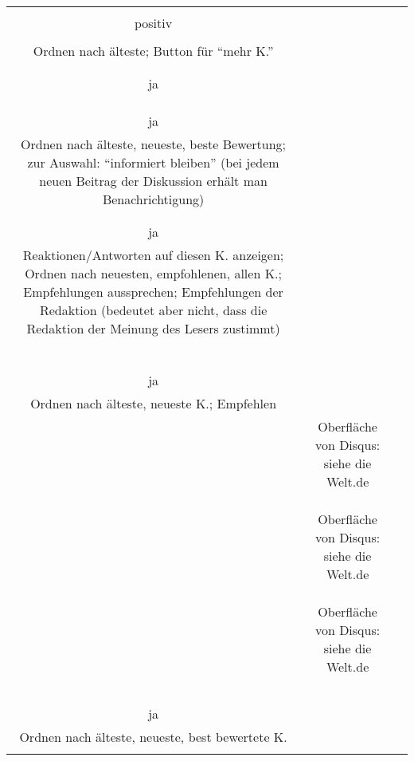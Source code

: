 \begin{landscape}
\begin{tabular}{ccc}
{		\\
		positiv\\
		\\
		Ordnen nach älteste; Button für ``mehr K.''\\
		\\
		\\
		ja\\
		\\
		&
		\\
		\\
		ja\\
		Ordnen nach älteste, neueste, beste Bewertung; zur Auswahl: ``informiert bleiben'' (bei jedem neuen Beitrag der Diskussion erhält man Benachrichtigung)\\
		&
		\\
		\\
		ja\\
		Reaktionen/Antworten auf diesen K. anzeigen; Ordnen nach neuesten, empfohlenen, allen K.; Empfehlungen aussprechen; Empfehlungen der Redaktion (bedeutet aber nicht, dass die Redaktion der Meinung des Lesers zustimmt)\\
		&
		\\
		\\
		\\
		\\
		&%
		\\
		\\
		ja\\
		Ordnen nach älteste, neueste K.; Empfehlen\\
		&%
		Oberfläche von Disqus: siehe die Welt.de\\
		\\
		\\
		\\
		&
		Oberfläche von Disqus: siehe die Welt.de\\
		\\
		\\
		\\
		&
		Oberfläche von Disqus: siehe die Welt.de\\
		\\
		\\
		\\
		&
		\\
		\\
		ja\\
		Ordnen nach älteste, neueste, best bewertete K.\\
		&
}
\end{tabular}
\end{landscape}
